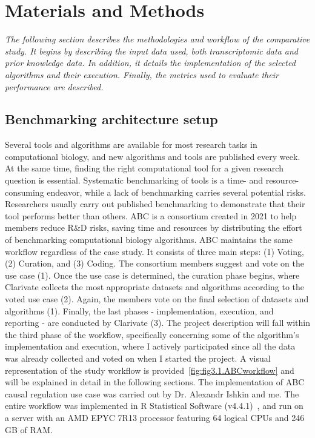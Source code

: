 ﻿%

%


\chapter{Materials and Methods}
\label{cha:materialsandmethods}


\textit{The following section describes the methodologies and workflow of the comparative study. 
It begins by describing the input data used, both transcriptomic data and prior knowledge data. 
In addition, it details the implementation of the selected algorithms and their execution. 
Finally, the metrics used to evaluate their performance are described.}

\section{Benchmarking architecture setup} %
\label{sec:benchmarkingarchitecturesetup}

Several tools and algorithms are available for most research tasks in computational biology, and new algorithms and tools are published every week. 
At the same time, finding the right computational tool for a given research question is essential.
Systematic benchmarking of tools is a time- and resource-consuming endeavor, while a lack of benchmarking carries several potential risks.
Researchers usually carry out published benchmarking to demonstrate that their tool performs better than others. 
\gls{ABC} is a consortium created in 2021 to help members reduce R\&D risks, saving time and resources by distributing the effort of benchmarking computational biology algorithms. 
\gls{ABC} maintains the same workflow regardless of the case study. It consists of three main steps: (1) Voting, (2) Curation, and (3) Coding. The consortium members suggest and vote on the use case (1). Once the use case is determined, the curation phase begins, where Clarivate collects the most appropriate datasets and algorithms according to the voted use case (2). Again, the members vote on the final selection of datasets and algorithms (1). Finally, the last phases - implementation, execution, and reporting - are conducted by Clarivate (3). 
The project description will fall within the third phase of the workflow, specifically concerning some of the algorithm's implementation and execution, where I actively participated since all the data was already collected and voted on when I started the project.
A visual representation of the study workflow is provided~\ref{fig:fig3.1.ABCworkflow} and will be explained in detail in the following sections.
The implementation of \gls{ABC} causal regulation use case was carried out by Dr. Alexandr Ishkin and me.
The entire workflow was implemented in \gls{R} Statistical Software (v4.4.1)~\cite{RN159}, and run on a server with an AMD EPYC 7R13 processor featuring 64 logical CPUs and 246 GB of RAM.

